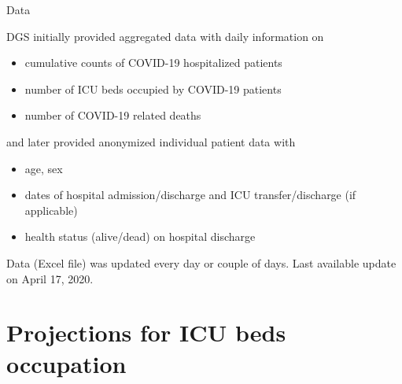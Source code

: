 \documentclass[t,9pt,xcolor=dvipsnames]{beamer}              %
\begin{document}
\begin{frame}{Data}
\justifying

DGS initially provided \alert{aggregated data} with daily information on
\begin{itemize}
\item cumulative counts of COVID-19 hospitalized patients
\item number of ICU beds occupied by COVID-19 patients
\item number of COVID-19 related deaths
\end{itemize}
\bigskip

and later provided anonymized \alert{individual patient data} with
\begin{itemize}
\item age, sex
\item dates of hospital admission/discharge and ICU transfer/discharge (if applicable)
\item health status (alive/dead) on hospital discharge
\end{itemize}

Data (Excel file) was updated every day or couple of days. Last available update on April 17, 2020.

\note{
\tiny
\justifying

}
\end{frame}


\section{Projections for ICU beds occupation}
\end{document}
